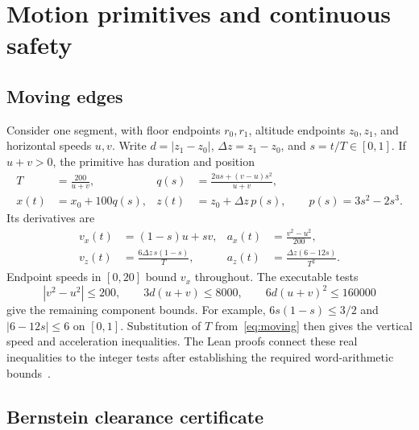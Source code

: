 \documentclass[11pt]{article}
\begin{document}
\section{Motion primitives and continuous safety}
\label{sec:primitives}

\subsection{Moving edges}

Consider one segment, with floor endpoints $r_0,r_1$, altitude endpoints $z_0,z_1$, and horizontal speeds $u,v$.  Write $d=|z_1-z_0|$, $\Delta z=z_1-z_0$, and $s=t/T\in[0,1]$.  If $u+v>0$, the primitive has duration and position
\begin{align}
 T&=\frac{200}{u+v},&
 q(s)&=\frac{2us+(v-u)s^2}{u+v},\label{eq:moving}\\
 x(t)&=x_0+100q(s),&
 z(t)&=z_0+\Delta z\,p(s),\qquad p(s)=3s^2-2s^3.
\end{align}
Its derivatives are
\begin{align}
 v_x(t)&=(1-s)u+sv,& a_x(t)&=\frac{v^2-u^2}{200},\\
 v_z(t)&=\frac{6\Delta z\,s(1-s)}{T},&
 a_z(t)&=\frac{\Delta z(6-12s)}{T^2}.
\end{align}
Endpoint speeds in $[0,20]$ bound $v_x$ throughout.  The executable tests
\begin{equation}
 |v^2-u^2|\leq200,\qquad
 3d(u+v)\leq8000,\qquad
 6d(u+v)^2\leq160000
 \label{eq:guards}
\end{equation}
give the remaining component bounds.  For example, $6s(1-s)\leq3/2$ and $|6-12s|\leq6$ on $[0,1]$.  Substitution of $T$ from~\eqref{eq:moving} then gives the vertical speed and acceleration inequalities.  The Lean proofs connect these real inequalities to the integer tests after establishing the required word-arithmetic bounds~\cite{drone-proofs}.

\subsection{Bernstein clearance certificate}
\end{document}
